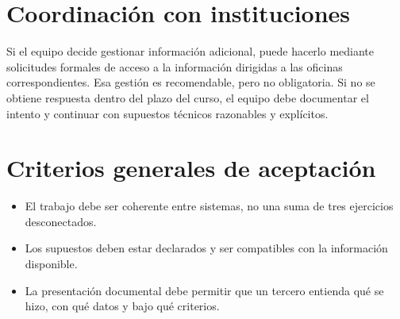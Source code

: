 \documentclass[11pt]{scrartcl}
\begin{document}
\section{Coordinación con instituciones}
Si el equipo decide gestionar información adicional, puede hacerlo
mediante solicitudes formales de acceso a la información dirigidas a
las oficinas correspondientes. Esa gestión es recomendable, pero no
obligatoria. Si no se obtiene respuesta dentro del plazo del curso, el
equipo debe documentar el intento y continuar con supuestos técnicos
razonables y explícitos.

\section{Criterios generales de aceptación}
\begin{itemize}
  \item El trabajo debe ser coherente entre sistemas, no una suma de
    tres ejercicios desconectados.
  \item Los supuestos deben estar declarados y ser compatibles con la
    información disponible.
  \item La presentación documental debe permitir que un tercero
    entienda qué se hizo, con qué datos y bajo qué criterios.
\end{itemize}
\end{document}
